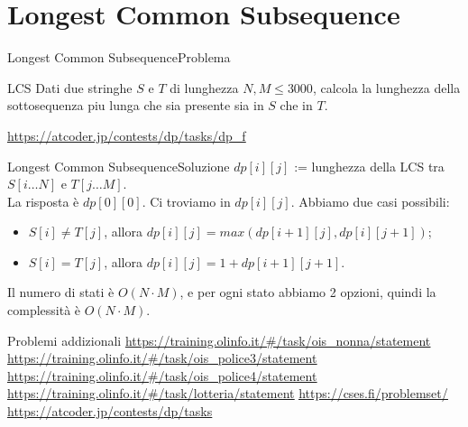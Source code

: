 \documentclass{beamer}
\begin{document}
\section{Longest Common Subsequence}
\begin{frame}{Longest Common Subsequence}{Problema}
    \begin{exampleblock}{LCS}
        Dati due stringhe $S$ e $T$ di lunghezza $N, M \le 3000$, calcola la lunghezza della sottosequenza piu lunga che sia presente sia in $S$ che in $T$.
    \end{exampleblock}
    \small{\underline{\url{https://atcoder.jp/contests/dp/tasks/dp_f}}}
\end{frame}

\begin{frame}{Longest Common Subsequence}{Soluzione}
    $dp[i][j]$ := lunghezza della LCS tra $S[i\dots N]$ e $T[j\dots M]$. \\
    La risposta \`e $dp[0][0]$.
    \vfill
    \pause
    Ci troviamo in $dp[i][j]$. Abbiamo due casi possibili:
    \begin{itemize}
        \item $S[i] \ne T[j]$, allora $dp[i][j] = max(dp[i+1][j], dp[i][j+1])$;
        \item $S[i] = T[j]$, allora $dp[i][j] = 1 + dp[i+1][j+1]$.
    \end{itemize}
    \pause
    \vfill
    Il numero di stati \`e $O(N \cdot M)$, e per ogni stato abbiamo 2 opzioni, quindi la complessit\`a \`e $O(N \cdot M)$.\\
    \pause
\end{frame}

\begin{frame}{Problemi addizionali}
    \underline{\url{https://training.olinfo.it/\#/task/ois_nonna/statement}}
    \underline{\url{https://training.olinfo.it/\#/task/ois_police3/statement}}
    \underline{\url{https://training.olinfo.it/\#/task/ois_police4/statement}}
    \underline{\url{https://training.olinfo.it/\#/task/lotteria/statement}}
    \underline{\url{https://cses.fi/problemset/}}
    \underline{\url{https://atcoder.jp/contests/dp/tasks}}
\end{frame}
\end{document}
